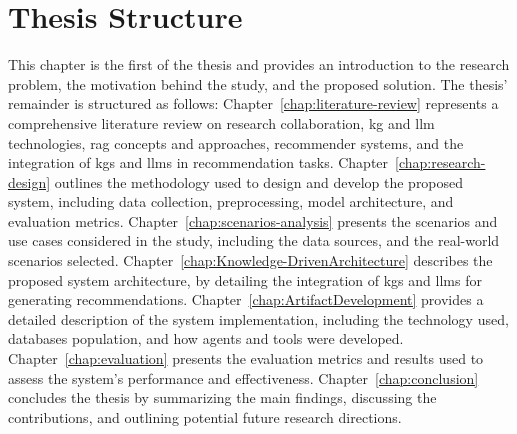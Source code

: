 \section{Thesis Structure}\label{sec:thesis-structure}
This chapter is the first of the thesis and provides an introduction to the research problem, the motivation behind the study, and the proposed solution.
The thesis' remainder is structured as follows: Chapter~\ref{chap:literature-review} represents a comprehensive literature review on research collaboration, \gls{kg} and \gls{llm} technologies, \gls{rag} concepts and approaches, recommender systems, and the integration of \glspl{kg} and \glspl{llm} in recommendation tasks.
Chapter~\ref{chap:research-design} outlines the methodology used to design and develop the proposed system, including data collection, preprocessing, model architecture, and evaluation metrics.
Chapter~\ref{chap:scenarios-analysis} presents the scenarios and use cases considered in the study, including the data sources, and the real-world scenarios selected.
Chapter~\ref{chap:Knowledge-DrivenArchitecture} describes the proposed system architecture, by detailing the integration of \glspl{kg} and \glspl{llm} for generating recommendations.
Chapter~\ref{chap:ArtifactDevelopment} provides a detailed description of the system implementation, including the technology used, databases population, and how agents and tools were developed.
Chapter~\ref{chap:evaluation} presents the evaluation metrics and results used to assess the system's performance and effectiveness.
Chapter~\ref{chap:conclusion} concludes the thesis by summarizing the main findings, discussing the contributions, and outlining potential future research directions.
%